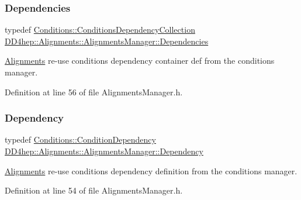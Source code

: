 \subsubsection{\texorpdfstring{Dependencies}{Dependencies}}
{\footnotesize\ttfamily typedef \hyperlink{class_d_d4hep_1_1_conditions_1_1_conditions_dependency_collection}{Conditions\+::\+Conditions\+Dependency\+Collection} \hyperlink{class_d_d4hep_1_1_alignments_1_1_alignments_manager_ae8068cb8b252db1243c87eccad69e980}{D\+D4hep\+::\+Alignments\+::\+Alignments\+Manager\+::\+Dependencies}}



\hyperlink{namespace_d_d4hep_1_1_alignments}{Alignments} re-\/use conditions dependency container def from the conditions manager. 



Definition at line 56 of file Alignments\+Manager.\+h.

\hypertarget{class_d_d4hep_1_1_alignments_1_1_alignments_manager_a62dad65e1472f8939e5a83f859e96d26}{}\label{class_d_d4hep_1_1_alignments_1_1_alignments_manager_a62dad65e1472f8939e5a83f859e96d26} 
\subsubsection{\texorpdfstring{Dependency}{Dependency}}
{\footnotesize\ttfamily typedef \hyperlink{class_d_d4hep_1_1_conditions_1_1_condition_dependency}{Conditions\+::\+Condition\+Dependency} \hyperlink{class_d_d4hep_1_1_alignments_1_1_alignments_manager_a62dad65e1472f8939e5a83f859e96d26}{D\+D4hep\+::\+Alignments\+::\+Alignments\+Manager\+::\+Dependency}}



\hyperlink{namespace_d_d4hep_1_1_alignments}{Alignments} re-\/use conditions dependency definition from the conditions manager. 



Definition at line 54 of file Alignments\+Manager.\+h.

\hypertarget{class_d_d4hep_1_1_alignments_1_1_alignments_manager_a45f94880f4e49efe8e77ce6d8e45275f}{}\label{class_d_d4hep_1_1_alignments_1_1_alignments_manager_a45f94880f4e49efe8e77ce6d8e45275f} 
